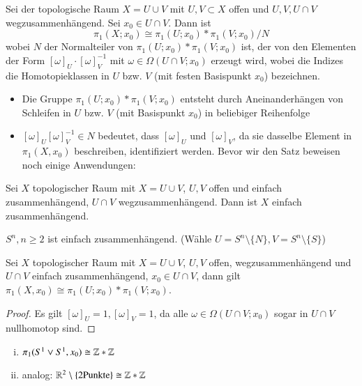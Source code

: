 \documentclass[a4paper,10pt]{scrartcl}
\begin{document}
\begin{st}\label{thm2:5.2}
 Sei der topologische Raum $X=U\cup V$ mit $U, V\subset X$ offen und $U,V, U\cap V$ wegzusammenhängend. Sei $x_0\in U\cap V$. Dann ist
\[
 \pi_1(X;x_0) \cong \pi_1(U;x_0)*\pi_1(V;x_0)/N
\]
wobei $N$ der Normalteiler von $\pi_1(U;x_0)*\pi_1(V;x_0)$ ist, der von den Elementen der Form $[\omega]_U\cdot [\omega]_V^{-1}$ mit $\omega\in \Omega(U\cap V; x_0)$ erzeugt wird, wobei die Indizes die Homotopieklassen in $U$ bzw. $V$ (mit festen Basispunkt $x_0$) bezeichnen.
\end{st}
\begin{note*}
 \begin{itemize}
  \item Die Gruppe $\pi_1(U;x_0)*\pi_1(V;x_0)$ entsteht durch Aneinanderhängen von Schleifen in $U$ bzw. $V$ (mit Basispunkt $x_0$) in beliebiger Reihenfolge
\begin{figure}[H]
\centering
\fixme[fig106]
\caption{}
\end{figure}
  \item $[\omega]_U[\omega]_V^{-1}\in N$ bedeutet, dass $[\omega]_U$ und $[\omega]_V$, da sie dasselbe Element in $\pi_1(X,x_0)$ beschreiben, identifiziert werden. Bevor wir den Satz beweisen noch einige Anwendungen:
 \end{itemize}
\end{note*}
\begin{kor}
 Sei $X$ topologischer Raum mit $X=U\cup V$, $U,V$ offen und einfach zusammenhängend, $U\cap V$ wegzusammenhängend. Dann ist $X$ einfach zusammenhängend.
\end{kor}
\begin{ex*}
 $S^n, n\ge 2$ ist einfach zusammenhängend. (Wähle $U=S^n\setminus\{N\}, V=S^n\setminus\{S\}$)
\end{ex*}
\begin{kor}
 Sei $X$ topologischer Raum mit $X=U\cup V$, $U,V$ offen, wegzusammenhängend und $U\cap V$ einfach zusammenhängend, $x_0\in U\cap V$, dann gilt $\pi_1(X,x_0)\cong \pi_1(U;x_0)*\pi_1(V;x_0)$.
\end{kor}
\begin{proof}
 Es gilt $[\omega]_U=1, [\omega]_V=1$, da alle $\omega \in \Omega(U\cap V;x_0)$ sogar in $U\cap V$ nullhomotop sind.
\end{proof}
\begin{ex*}
 \begin{enumerate}[(i)]
  \item $\pi_1(S^1\vee S^1, x_0)\cong \mathbb{Z}*\mathbb{Z}$
\begin{figure}[H]
 \centering
\fixme[fig107]
\caption{}
\end{figure}

  \item analog: $\mathbb{R}^2\setminus\{2 \text{Punkte}\}\cong \mathbb{Z}*\mathbb{Z}$
\begin{figure}[H]
 \centering

\caption{}
\end{figure}
 \end{enumerate}
\end{ex*}
\end{document}
